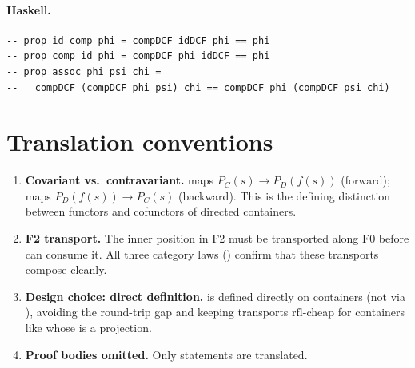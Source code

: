 \documentclass[11pt,a4paper]{article}
\begin{document}
\paragraph{Haskell.}
\begin{lstlisting}[style=haskell]
-- prop_id_comp phi = compDCF idDCF phi == phi
-- prop_comp_id phi = compDCF phi idDCF == phi
-- prop_assoc phi psi chi =
--   compDCF (compDCF phi psi) chi == compDCF phi (compDCF psi chi)
\end{lstlisting}


\section{Translation conventions}

\begin{enumerate}
\item \textbf{Covariant vs.\ contravariant.}   maps
  $P_C(s) \to P_D(f(s))$ (forward);  maps
  $P_D(f(s)) \to P_C(s)$ (backward).  This is the defining distinction
  between functors and cofunctors of directed containers.

\item \textbf{F2 transport.}  The inner position in F2 must be transported
  along F0 before  can consume it.  All three category laws
  () confirm that these transports compose cleanly.

\item \textbf{Design choice: direct definition.}   is
  defined directly on containers (not via ), avoiding the
  round-trip gap and keeping transports $\mathrm{rfl}$-cheap for containers
  like  whose  is a projection.

\item \textbf{Proof bodies omitted.}  Only statements are translated.
\end{enumerate}
\end{document}
